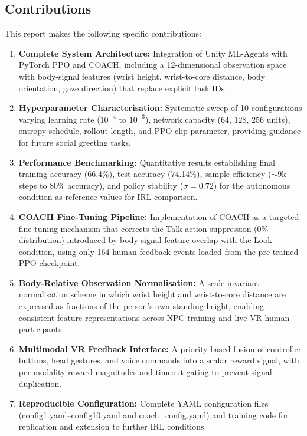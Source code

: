 \documentclass[../report.tex]{subfiles}
\begin{document}
    \subsection{Contributions}
    \label{sec:introduction:contributions}

    This report makes the following specific contributions:

    \begin{enumerate}
        \item \textbf{Complete System Architecture:} Integration of Unity ML-Agents with PyTorch PPO and COACH, including a 12-dimensional observation space with body-signal features (wrist height, wrist-to-core distance, body orientation, gaze direction) that replace explicit task IDs.

        \item \textbf{Hyperparameter Characterisation:} Systematic sweep of 10 configurations varying learning rate ($10^{-4}$ to $10^{-3}$), network capacity (64, 128, 256 units), entropy schedule, rollout length, and PPO clip parameter, providing guidance for future social greeting tasks.

        \item \textbf{Performance Benchmarking:} Quantitative results establishing final training accuracy (66.4\%), test accuracy (74.14\%), sample efficiency ($\sim$9k steps to 80\% accuracy), and policy stability ($\sigma = 0.72$) for the autonomous condition as reference values for IRL comparison.

        \item \textbf{COACH Fine-Tuning Pipeline:} Implementation of COACH as a targeted fine-tuning mechanism that corrects the Talk action suppression (0\% distribution) introduced by body-signal feature overlap with the Look condition, using only 164 human feedback events loaded from the pre-trained PPO checkpoint.

        \item \textbf{Body-Relative Observation Normalisation:} A scale-invariant normalisation scheme in which wrist height and wrist-to-core distance are expressed as fractions of the person's own standing height, enabling consistent feature representations across NPC training and live VR human participants.

        \item \textbf{Multimodal VR Feedback Interface:} A priority-based fusion of controller buttons, head gestures, and voice commands into a scalar reward signal, with per-modality reward magnitudes and timeout gating to prevent signal duplication.

        \item \textbf{Reproducible Configuration:} Complete YAML configuration files (config1.yaml--config10.yaml and coach\_config.yaml) and training code for replication and extension to further IRL conditions.
    \end{enumerate}
\end{document}
